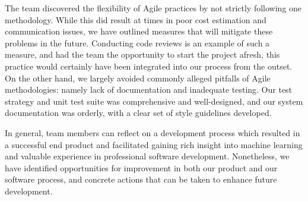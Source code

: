 \documentclass{l3proj}
\begin{document}
The team discovered the flexibility of Agile practices by not strictly following one methodology. While this did result at times in poor cost estimation and communication issues, we have outlined measures that will mitigate these problems in the future. Conducting code reviews is an example of such a measure, and had the team the opportunity to start the project afresh, this practice would certainly have been integrated into our process from the outset. On the other hand, we largely avoided commonly alleged pitfalls of Agile methodologies: namely lack of documentation and inadequate testing. Our test strategy and unit test suite was comprehensive and well-designed, and our system documentation was orderly, with a clear set of style guidelines developed.

In general, team members can reflect on a development process which resulted in a successful end product and facilitated gaining rich insight into machine learning and valuable experience in professional software development. Nonetheless, we have identified opportunities for improvement in both our product and our software process, and concrete actions that can be taken to enhance future development.

\newpage


\end{document}
